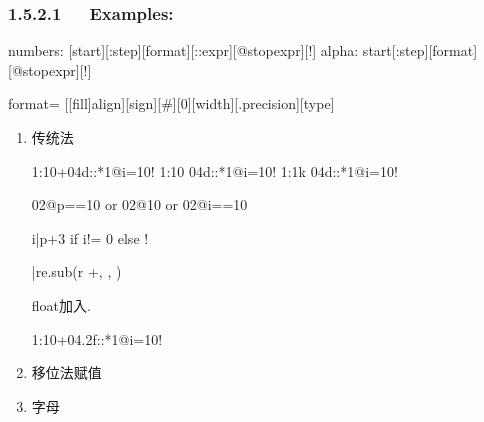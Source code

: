 \documentclass[letterpaper,12pt,english]{sphinxmanual}
\begin{document}
\subsubsection{1.5.2.1   Examples:}
\label{\detokenize{001software/001install/sublime:examples}}
\begin{sphinxVerbatim}[commandchars=\\\{\}]
numbers: [\PYGZlt{}start\PYGZgt{}][:\PYGZlt{}step\PYGZgt{}][\PYGZti{}\PYGZlt{}format\PYGZgt{}][::\PYGZlt{}expr\PYGZgt{}][@\PYGZlt{}stopexpr\PYGZgt{}][!]
alpha:   \PYGZlt{}start\PYGZgt{}[:\PYGZlt{}step\PYGZgt{}][\PYGZti{}\PYGZlt{}format\PYGZgt{}][@\PYGZlt{}stopexpr\PYGZgt{}][!]
\end{sphinxVerbatim}

format= {[}{[}fill{]}align{]}{[}sign{]}{[}\#{]}{[}0{]}{[}width{]}{[}.precision{]}{[}type{]}
\begin{enumerate}
%
\item {} 
传统法

\begin{sphinxVerbatim}[commandchars=\\\{\}]
1:1\PYGZti{}0\PYGZgt{}+\PYGZsh{}04d::\PYGZus{}*1@i\PYGZgt{}=10!
1:1\PYGZti{}0\PYGZgt{} \PYGZsh{}04d::\PYGZus{}*1@i\PYGZgt{}=10!
1:1\PYGZti{}k\PYGZgt{} \PYGZsh{}04d::\PYGZus{}*1@i\PYGZgt{}=10!

\PYGZti{}02@p==10 or \PYGZti{}02@\PYGZus{}\PYGZgt{}10 or \PYGZti{}02@i==10

i|p+3 if i!= 0 else \PYGZus{}!

|re.sub(r\PYGZsq{} +\PYGZsq{}, \PYGZsq{} \PYGZsq{}, \PYGZus{})

float加入.

1:1\PYGZti{}0\PYGZgt{}+\PYGZsh{}04.2f::\PYGZus{}*1@i\PYGZgt{}=10!
\end{sphinxVerbatim}

\item {} 
移位法赋值

\begin{sphinxVerbatim}[commandchars=\\\{\}]
\end{sphinxVerbatim}

\item {} 
字母

\begin{sphinxVerbatim}[commandchars=\\\{\}]
  
\end{sphinxVerbatim}

\end{enumerate}
\end{document}
